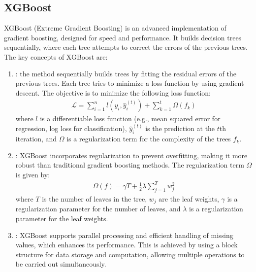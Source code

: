\documentclass[letterpaper,10pt,english]{jupyterBook}
\begin{document}
\subsection{XGBoost}
\label{\detokenize{notebooks/review_ML:xgboost}}
\sphinxAtStartPar
XGBoost (Extreme Gradient Boosting) is an advanced implementation of gradient boosting, designed for speed and performance. It builds decision trees sequentially, where each tree attempts to correct the errors of the previous trees. The key concepts of XGBoost are:
\begin{enumerate}
%
\item {} 
\sphinxAtStartPar
{}: the method sequentially builds trees by fitting the residual errors of the previous trees. Each tree tries to minimize a loss function by using gradient descent. The objective is to minimize the following loss function:
\begin{equation*}
\begin{split}
   \mathcal{L} = \sum_{i=1}^{n} l(y_i, \hat{y}_i^{(t)}) + \sum_{k=1}^{t} \Omega(f_k)
   \end{split}
\end{equation*}
\sphinxAtStartPar
where \(l\) is a differentiable loss function (e.g., mean squared error for regression, log loss for classification), \(\hat{y}_i^{(t)}\) is the prediction at the \(t\)\sphinxhyphen{}th iteration, and \(\Omega\) is a regularization term for the complexity of the trees \(f_k\).

\item {} 
\sphinxAtStartPar
{}: XGBoost incorporates regularization to prevent overfitting, making it more robust than traditional gradient boosting methods. The regularization term \(\Omega\) is given by:
\begin{equation*}
\begin{split}
   \Omega(f) = \gamma T + \frac{1}{2} \lambda \sum_{j=1}^{T} w_j^2
   \end{split}
\end{equation*}
\sphinxAtStartPar
where \(T\) is the number of leaves in the tree, \(w_j\) are the leaf weights, \(\gamma\) is a regularization parameter for the number of leaves, and \(\lambda\) is a regularization parameter for the leaf weights.

\item {} 
\sphinxAtStartPar
{}: XGBoost supports parallel processing and efficient handling of missing values, which enhances its performance. This is achieved by using a block structure for data storage and computation, allowing multiple operations to be carried out simultaneously.

\end{enumerate}
\end{document}
